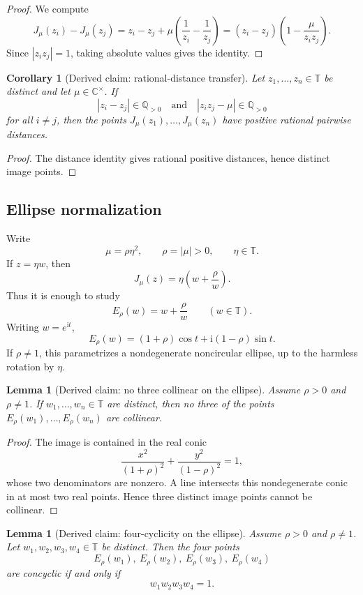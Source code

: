 \documentclass[11pt]{article}
\newtheorem{lemma}[theorem]{Lemma}
\newtheorem{corollary}[theorem]{Corollary}
\theoremstyle{definition}
\theoremstyle{remark}
\newcommand{\C}{\mathbb{C}}
\newcommand{\Q}{\mathbb{Q}}
\newcommand{\T}{\mathbb{T}}
\newcommand{\ii}{\mathrm{i}}
\newcommand{\abs}[1]{\left|#1\right|}
\begin{document}
\begin{proof}
We compute
\[
J_\mu(z_i)-J_\mu(z_j)
=z_i-z_j+\mu\left(\frac1{z_i}-\frac1{z_j}\right)
=(z_i-z_j)\left(1-\frac{\mu}{z_i z_j}\right).
\]
Since \(\abs{z_i z_j}=1\), taking absolute values gives the identity.
\end{proof}

\begin{corollary}[Derived claim: rational-distance transfer]
Let \(z_1,\ldots,z_n\in\T\) be distinct and let \(\mu\in\C^\times\).  If
\[
\abs{z_i-z_j}\in\Q_{>0}
\quad\text{and}\quad
\abs{z_i z_j-\mu}\in\Q_{>0}
\]
for all \(i\ne j\), then the points \(J_\mu(z_1),\ldots,J_\mu(z_n)\) have
positive rational pairwise distances.
\end{corollary}

\begin{proof}
The distance identity gives rational positive distances, hence distinct image
points.
\end{proof}

\subsection{Ellipse normalization}

Write
\[
\mu=\rho\eta^2,
\qquad
\rho=\abs\mu>0,
\qquad
\eta\in\T.
\]
If \(z=\eta w\), then
\[
J_\mu(z)=\eta\left(w+\frac{\rho}{w}\right).
\]
Thus it is enough to study
\[
E_\rho(w)=w+\frac{\rho}{w}\qquad (w\in\T).
\]
Writing \(w=e^{\ii t}\),
\[
E_\rho(w)=(1+\rho)\cos t+\ii(1-\rho)\sin t.
\]
If \(\rho\ne 1\), this parametrizes a nondegenerate noncircular ellipse, up to
the harmless rotation by \(\eta\).

\begin{lemma}[Derived claim: no three collinear on the ellipse]
Assume \(\rho>0\) and \(\rho\ne 1\).  If \(w_1,
\ldots,w_n\in\T\) are distinct, then no three of the points
\(E_\rho(w_1),\ldots,E_\rho(w_n)\) are collinear.
\end{lemma}

\begin{proof}
The image is contained in the real conic
\[
\frac{x^2}{{(1+\rho)}^2}+\frac{y^2}{{(1-\rho)}^2}=1,
\]
whose two denominators are nonzero.  A line intersects this nondegenerate conic
in at most two real points.  Hence three distinct image points cannot be
collinear.
\end{proof}

\begin{lemma}[Derived claim: four-cyclicity on the ellipse]\label{lem:ellipse-cyclic}
Assume \(\rho>0\) and \(\rho\ne 1\).  Let
\(w_1,w_2,w_3,w_4\in\T\) be distinct.  Then the four points
\[
E_\rho(w_1),\ E_\rho(w_2),\ E_\rho(w_3),\ E_\rho(w_4)
\]
are concyclic if and only if
\[
w_1w_2w_3w_4=1.
\]
\end{lemma}
\end{document}
